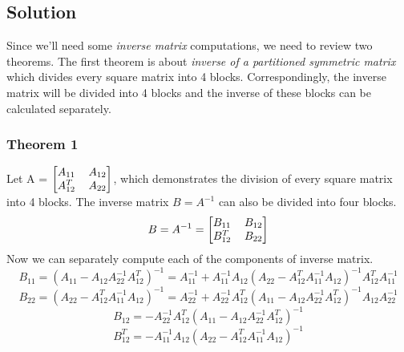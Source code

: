 \documentclass[12pt]{article}
\numberwithin{equation}{section}
\numberwithin{table}{section}
\numberwithin{figure}{section}
\begin{document}
\subsection*{Solution}
Since we'll need some \textit{inverse matrix} computations, we need to review two theorems. The first theorem is about \textit{inverse of a partitioned symmetric matrix} which divides every square matrix into 4 blocks. Correspondingly, the inverse matrix will be divided into 4 blocks and the inverse of these blocks can be calculated separately.

\subsubsection*{Theorem 1}
Let A = $
	\renewcommand\arraystretch{1}
	\setlength\arraycolsep{6pt}
	\begin{bmatrix}
	A_{11} & A_{12} \\
	A_{12}^T & A_{22}\\
	\end{bmatrix}$,
which demonstrates the division of every square matrix into 4 blocks. The inverse matrix $B=A^{-1}$ can also be divided into four blocks.
$$
	 B = A^{-1} = 
	 \renewcommand\arraystretch{1}
	 \setlength\arraycolsep{6pt}
	 \begin{bmatrix}
	 B_{11} & B_{12} \\
	 B_{12}^T & B_{22}\\
 \end{bmatrix}
$$
Now we can separately compute each of the components of inverse matrix.
$$
	B_{11} = (A_{11} - A_{12}A_{22}^{-1}A_{12}^{T})^{-1} = A_{11}^{-1} + A_{11}^{-1}A_{12}(A_{22} - A_{12}^{T}A_{11}^{-1}A_{12})^{-1}A_{12}^{T}A_{11}^{-1}
$$
$$
B_{22} = (A_{22} - A_{12}^{T}A_{11}^{-1}A_{12})^{-1} = A_{22}^{-1} + A_{22}^{-1}A_{12}^{T}(A_{11} - A_{12}A_{22}^{-1}A_{12}^{T})^{-1}A_{12}A_{22}^{-1}
$$
$$
B_{12} = -A_{22}^{-1}A_{12}^{T}(A_{11}-A_{12}A_{22}^{-1}A_{12}^T)^{-1}
$$
$$
B_{12}^{T} = -A_{11}^{-1}A_{12}(A_{22}-A_{12}^{T}A_{11}^{-1}A_{12})^{-1}
$$
\end{document}
